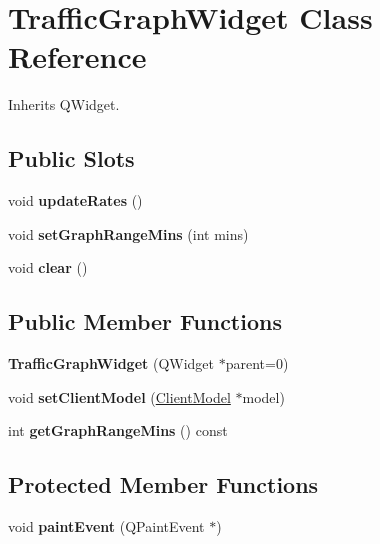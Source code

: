 \hypertarget{class_traffic_graph_widget}{}\section{Traffic\+Graph\+Widget Class Reference}
\label{class_traffic_graph_widget}


Inherits Q\+Widget.

\subsection*{Public Slots}
\begin{DoxyCompactItemize}
\item 
\mbox{\label{class_traffic_graph_widget_a5a1ae0d0a8cc43c67386de4aa1111340}} 
void {\bfseries update\+Rates} ()
\item 
\mbox{\label{class_traffic_graph_widget_aa08cb5ae735e58a79bdff42b933ec4c4}} 
void {\bfseries set\+Graph\+Range\+Mins} (int mins)
\item 
\mbox{\label{class_traffic_graph_widget_a71c23db2649ab8781fa9a294e540b7ee}} 
void {\bfseries clear} ()
\end{DoxyCompactItemize}
\subsection*{Public Member Functions}
\begin{DoxyCompactItemize}
\item 
\mbox{\label{class_traffic_graph_widget_a99f4f3f14bab99bef8918cb4f5f69aa6}} 
{\bfseries Traffic\+Graph\+Widget} (Q\+Widget $\ast$parent=0)
\item 
\mbox{\label{class_traffic_graph_widget_a8f627aaf6171695d94a0e83b239fe1ac}} 
void {\bfseries set\+Client\+Model} (\mbox{\hyperlink{class_client_model}{Client\+Model}} $\ast$model)
\item 
\mbox{\label{class_traffic_graph_widget_a87cfbad14e4035755b5feb4ebff4c75c}} 
int {\bfseries get\+Graph\+Range\+Mins} () const
\end{DoxyCompactItemize}
\subsection*{Protected Member Functions}
\begin{DoxyCompactItemize}
\item 
\mbox{\label{class_traffic_graph_widget_a728112be94b731a17ff36136e48adcb2}} 
void {\bfseries paint\+Event} (Q\+Paint\+Event $\ast$)
\end{DoxyCompactItemize}



